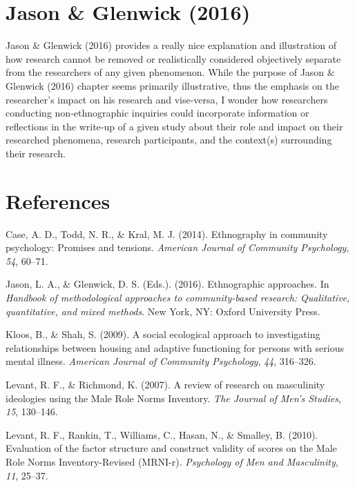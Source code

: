 \documentclass[11pt,]{tufte-handout}
\begin{document}
\section{Jason \& Glenwick (2016)}\label{dutta2016ethnographic}

Jason \& Glenwick (2016) provides a really nice explanation and
illustration of how research cannot be removed or realistically
considered objectively separate from the researchers of any given
phenomenon. While the purpose of Jason \& Glenwick (2016) chapter seems
primarily illustrative, thus the emphasis on the researcher's impact on
his research and vise-versa, I wonder how researchers conducting
non-ethnographic inquiries could incorporate information or reflections
in the write-up of a given study about their role and impact on their
researched phenomena, research participants, and the context(s)
surrounding their research.

\newpage

\section*{References}\label{references}

\hypertarget{refs}{}
\hypertarget{ref-case2014ethnography}{}
Case, A. D., Todd, N. R., \& Kral, M. J. (2014). Ethnography in
community psychology: Promises and tensions. \emph{American Journal of
Community Psychology}, \emph{54}, 60--71.

\hypertarget{ref-dutta2016ethnographic}{}
Jason, L. A., \& Glenwick, D. S. (Eds.). (2016). Ethnographic
approaches. In \emph{Handbook of methodological approaches to
community-based research: Qualitative, quantitative, and mixed methods}.
New York, NY: Oxford University Press.

\hypertarget{ref-kloos2009social}{}
Kloos, B., \& Shah, S. (2009). A social ecological approach to
investigating relationships between housing and adaptive functioning for
persons with serious mental illness. \emph{American Journal of Community
Psychology}, \emph{44}, 316--326.

\hypertarget{ref-levant2007review}{}
Levant, R. F., \& Richmond, K. (2007). A review of research on
masculinity ideologies using the Male Role Norms Inventory. \emph{The
Journal of Men's Studies}, \emph{15}, 130--146.

\hypertarget{ref-levant2010evaluation}{}
Levant, R. F., Rankin, T., Williams, C., Hasan, N., \& Smalley, B.
(2010). Evaluation of the factor structure and construct validity of
scores on the Male Role Norms Inventory-Revised (MRNI-r).
\emph{Psychology of Men and Masculinity}, \emph{11}, 25--37.
\end{document}
